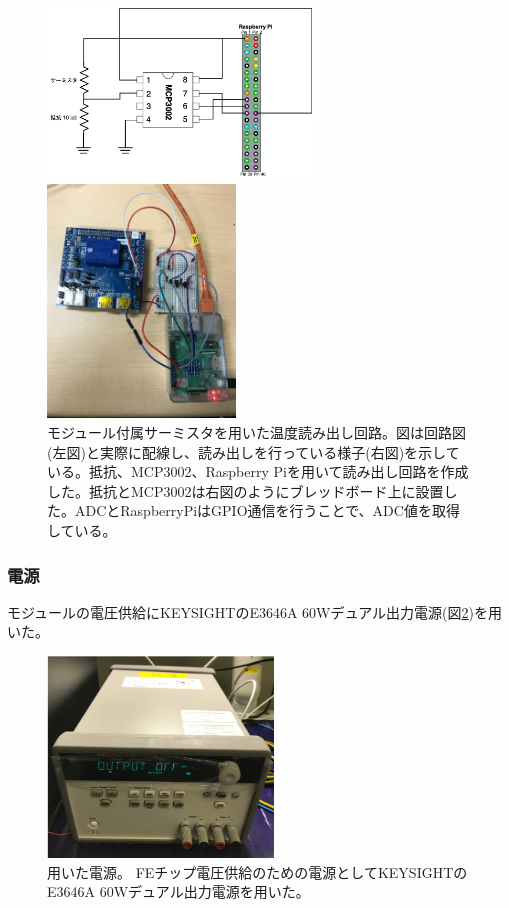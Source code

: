 \begin{figure}[h]\centering
  \begin{minipage}{0.5\hsize}
    \includegraphics[width=7cm]{temp_circit}
  \end{minipage}
  \begin{minipage}{0.4\hsize}
    \includegraphics[width=5cm]{temp_circit_pic}
  \end{minipage}
\caption[モジュール付属サーミスタを用いた温度読み出し回路]{モジュール付属サーミスタを用いた温度読み出し回路。図は回路図(左図)と実際に配線し、読み出しを行っている様子(右図)を示している。抵抗、MCP3002、Raspberry Piを用いて読み出し回路を作成した。抵抗とMCP3002は右図のようにブレッドボード上に設置した。ADCとRaspberryPiはGPIO通信\cite{5-9}を行うことで、ADC値を取得している。}
\label{demo_temp_circit_pic}
\end{figure}

\subsubsection{電源}
モジュールの電圧供給にKEYSIGHTのE3646A 60Wデュアル出力電源\cite{5-1}(図\ref{demo_power_supply})を用いた。
\begin{figure}[h]\centering
\includegraphics[width=6cm]{power_supply}
\caption[用いた電源]{用いた電源。 FEチップ電圧供給のための電源としてKEYSIGHTのE3646A 60Wデュアル出力電源\cite{5-1}を用いた。}
\label{demo_power_supply}
\end{figure}

